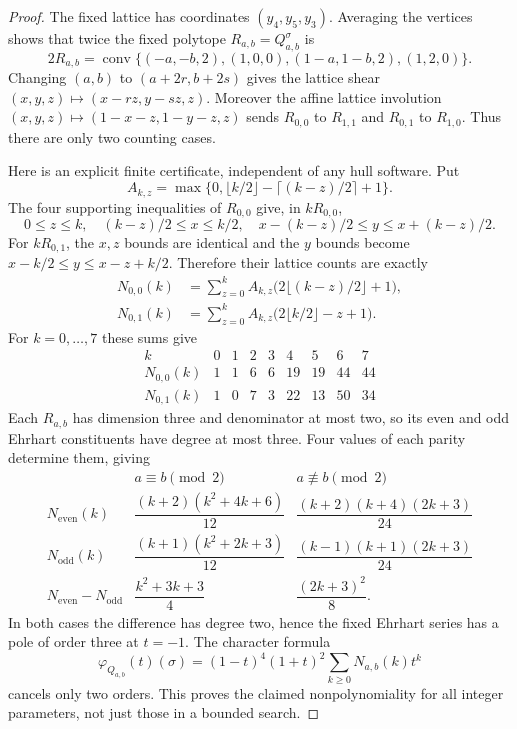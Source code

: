 \documentclass[11pt,a4paper]{article}
\theoremstyle{definition}\newtheorem{definition}[theorem]{Definition}
\theoremstyle{remark}\newtheorem{remark}[theorem]{Remark}
\begin{document}
\begin{proof}
The fixed lattice has coordinates $(y_4,y_5,y_3)$. Averaging the vertices
shows that twice the fixed polytope $R_{a,b}=Q_{a,b}^{\sigma}$ is
\[
 2R_{a,b}=\operatorname{conv}\{(-a,-b,2),(1,0,0),
                                  (1-a,1-b,2),(1,2,0)\}.
\]
Changing $(a,b)$ to $(a+2r,b+2s)$ gives the lattice shear
$(x,y,z)\mapsto(x-rz,y-sz,z)$. Moreover the affine lattice involution
$(x,y,z)\mapsto(1-x-z,1-y-z,z)$ sends $R_{0,0}$ to $R_{1,1}$ and
$R_{0,1}$ to $R_{1,0}$. Thus there are only two counting cases.

Here is an explicit finite certificate, independent of any hull software.
Put
\[
 A_{k,z}=\max\{0,\lfloor k/2\rfloor-\lceil(k-z)/2\rceil+1\}.
\]
The four supporting inequalities of $R_{0,0}$ give, in $kR_{0,0}$,
\[
 0\leq z\leq k,\quad (k-z)/2\leq x\leq k/2,\quad
 x-(k-z)/2\leq y\leq x+(k-z)/2.
\]
For $kR_{0,1}$, the $x,z$ bounds are identical and the $y$ bounds become
$x-k/2\leq y\leq x-z+k/2$. Therefore their lattice counts are exactly
\begin{align*}
 N_{0,0}(k)&=\sum_{z=0}^{k}A_{k,z}\bigl(2\lfloor(k-z)/2\rfloor+1\bigr),\\
 N_{0,1}(k)&=\sum_{z=0}^{k}A_{k,z}\bigl(2\lfloor k/2\rfloor-z+1\bigr).
\end{align*}
For $k=0,\ldots,7$ these sums give
\[
\begin{array}{c|rrrrrrrr}
 k&0&1&2&3&4&5&6&7\\\hline
 N_{0,0}(k)&1&1&6&6&19&19&44&44\\
 N_{0,1}(k)&1&0&7&3&22&13&50&34
\end{array}
\]
Each $R_{a,b}$ has dimension three and denominator at most two, so its
even and odd Ehrhart constituents have degree at most three. Four values
of each parity determine them, giving
\[
\begin{array}{c|cc}
 &a\equiv b\pmod2&a\not\equiv b\pmod2\\\hline
 N_{\mathrm{even}}(k)&
 \dfrac{(k+2)(k^2+4k+6)}{12}&
 \dfrac{(k+2)(k+4)(2k+3)}{24}\\[5pt]
 N_{\mathrm{odd}}(k)&
 \dfrac{(k+1)(k^2+2k+3)}{12}&
 \dfrac{(k-1)(k+1)(2k+3)}{24}\\[5pt]
 N_{\mathrm{even}}-N_{\mathrm{odd}}&
 \dfrac{k^2+3k+3}{4}&\dfrac{(2k+3)^2}{8}.
\end{array}
\]
In both cases the difference has degree two, hence the fixed Ehrhart
series has a pole of order three at $t=-1$. The character formula
\[
 \varphi_{Q_{a,b}}(t)(\sigma)
  =(1-t)^4(1+t)^2\sum_{k\geq0}N_{a,b}(k)t^k
\]
cancels only two orders. This proves the claimed nonpolynomiality for all
integer parameters, not just those in a bounded search.
\end{proof}
\end{document}
